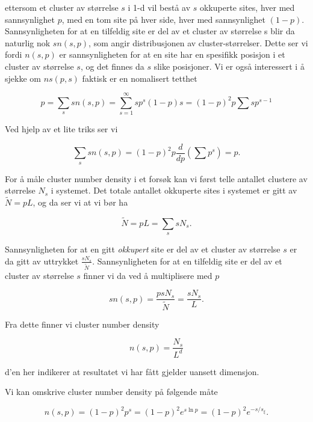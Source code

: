 \documentclass[a4paper,10pt]{article}
\begin{document}
ettersom et cluster av størrelse $s$ i 1-d vil bestå av $s$ okkuperte sites, hver med sannsynlighet $p$, med en tom site på hver side, hver med sannsynlighet $(1-p)$. Sannsynligheten for at en tilfeldig site er del av et cluster av størrelse s blir da naturlig nok $s n(s,p)$, som angir distribusjonen av cluster-størrelser. Dette ser vi fordi $n(s,p)$ er sannsynligheten for at en site har en spesifikk posisjon i et cluster av størrelse $s$, og det finnes da $s$ slike posisjoner. Vi er også interessert i å sjekke om $ns(p,s)$ faktisk er en nomalisert tetthet

\begin{equation}
 p = \sum_s sn(s,p) = \sum_{s=1}^{\infty} sp^s(1-p)s = (1-p)^2p\sum sp^{s-1}
\end{equation}

Ved hjelp av et lite triks ser vi 

\begin{equation}
 \sum_s sn(s,p) = (1-p)^2p\frac{d}{dp}(\sum p^s) = p.
\end{equation}

For å måle cluster number density i et forsøk kan vi først telle antallet clustere av størrelse $N_s$ i systemet. Det totale antallet okkuperte sites i systemet er gitt av $\tilde{N} = pL$, og da ser vi at vi bør ha 

\begin{equation}
 \tilde{N} = pL = \sum_ssN_s.
\end{equation}

Sannsynligheten for at en gitt \textit{okkupert} site er del av et cluster av størrelse $s$ er da gitt av uttrykket $\frac{sN_s}{\tilde{N}}$. Sannsynligheten for at en tilfeldig site er del av et cluster av størrelse $s$ finner vi da ved å multiplisere med $p$

\begin{equation}
 sn(s,p) = \frac{psN_s}{\tilde{N}} = \frac{sN_s}{L}.
\end{equation}

Fra dette finner vi cluster number density

\begin{equation}
 n(s,p) = \frac{N_s}{L^d}
\end{equation}

d'en her indikerer at resultatet vi har fått gjelder uansett dimensjon. 

Vi kan omskrive cluster number density på følgende måte

\begin{equation}
 n(s,p) = (1-p)^2p^s = (1-p)^2e^{s\ln p} = (1-p)^2e^{-s/s_{\xi}}.
\end{equation}
\end{document}
